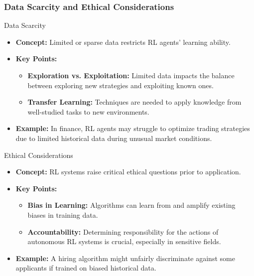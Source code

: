 \documentclass[aspectratio=169]{beamer}
\begin{document}
\begin{frame}[fragile]
    \frametitle{Data Scarcity and Ethical Considerations}
    \begin{block}{Data Scarcity}
        \begin{itemize}
            \item \textbf{Concept:} Limited or sparse data restricts RL agents' learning ability.
            \item \textbf{Key Points:}
            \begin{itemize}
                \item \textbf{Exploration vs. Exploitation:} Limited data impacts the balance between exploring new strategies and exploiting known ones.
                \item \textbf{Transfer Learning:} Techniques are needed to apply knowledge from well-studied tasks to new environments.
            \end{itemize}
            \item \textbf{Example:} In finance, RL agents may struggle to optimize trading strategies due to limited historical data during unusual market conditions.
        \end{itemize}
    \end{block}

    \begin{block}{Ethical Considerations}
        \begin{itemize}
            \item \textbf{Concept:} RL systems raise critical ethical questions prior to application.
            \item \textbf{Key Points:}
            \begin{itemize}
                \item \textbf{Bias in Learning:} Algorithms can learn from and amplify existing biases in training data.
                \item \textbf{Accountability:} Determining responsibility for the actions of autonomous RL systems is crucial, especially in sensitive fields.
            \end{itemize}
            \item \textbf{Example:} A hiring algorithm might unfairly discriminate against some applicants if trained on biased historical data.
        \end{itemize}
    \end{block}
\end{frame}
\end{document}
